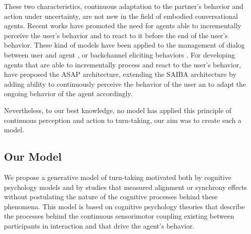  These two characteristics, continuous adaptation to the partner's behavior and action under uncertainty, are not new in the field of embodied conversational agents. Recent works have promoted the need for agents able to incrementally perceive the user's behavior and to react to it before the end of the user's behavior. These kind of models have been applied to the management of dialog between user and agent \cite{skantze_towards_2010}, or backchannel eliciting behaviors \cite{buschmeier_when_2014}. For developing agents that are able to incrementally process and react to the user's behavior, \cite{kopp_architecture_2014} have proposed the ASAP architecture, extending the SAIBA architecture by adding ability to continuously perceive the behavior of the user an to adapt the ongoing behavior of the agent accordingly. 
 
 Nevertheless, to our best knowledge, no model has applied this principle of continuous perception and action to turn-taking, our aim was to create such a model. 

\subsection{Our Model}

We propose a generative model of turn-taking motivated both by cognitive psychology models and by studies
that measured alignment or synchrony effects without postulating the nature of the cognitive processes
behind these phenomena. This model is based on cognitive psychology theories that describe the
processes behind the continuous sensorimotor coupling existing between participants in interaction and that
drive the agent's behavior.



